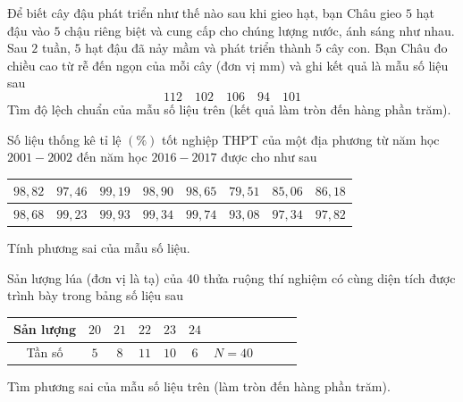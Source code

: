 \begin{bt}%
	Để biết cây đậu phát triển như thế nào sau khi gieo hạt, bạn Châu gieo $5$ hạt đậu vào $5$ chậu riêng biệt và cung cấp cho chúng lượng nước, ánh sáng như nhau. Sau  $2$ tuần, $5$ hạt đậu đã nảy mầm và phát triển thành $5$ cây con. Bạn Châu đo chiều cao từ rễ đến ngọn của mỗi cây (đơn vị mm) và ghi kết quả là mẫu số liệu sau
	 \[112 \quad 102 \quad 106 \quad 94 \quad 101 \]
	 Tìm độ lệch chuẩn của mẫu số liệu trên (kết quả làm tròn đến hàng phần trăm).
\end{bt}

\begin{bt}%
	Số liệu thống kê tỉ lệ $(\%)$ tốt nghiệp THPT của một địa phương từ năm học $2001 - 2002$ đến năm học $2016 - 2017$ được cho như  sau
	\begin{center}
		\begin{tabular}{|c|c|c|c|c|c|c|c|}
			\hline  $98{,}82$ & $97{,}46$ & $99{,}19$ & $98{,}90$ & $98{,}65$ & $79{,}51$ & $85{,}06$ & $86{,}18$ \\
			\hline $98{,}68$ & $99{,}23$  & $99{,}93$ & $99{,}34$ & $99{,}74$ & $93{,}08$ & $97{,}34$ & $97{,}82$ \\
			 \hline
		\end{tabular}
	\end{center}
	Tính phương sai của mẫu số liệu. 
\end{bt}

\begin{bt}%
	Sản lượng lúa (đơn vị là tạ) của $40$ thửa ruộng thí nghiệm có cùng diện tích được trình bày trong bảng số liệu  sau
	\begin{center}
		\begin{tabular}{|c|c|c|c|c|c|c|c|c|c|}
			\hline Sản lượng & $20$ & $21$ & $22$ &  $23$ & $24$ & \\
			\hline Tần số & $5$ & $8$ & $11$ & $10$ & $6$ & $N=40$ \\ 
			\hline 
		\end{tabular}
	\end{center}
	Tìm phương sai của mẫu số liệu trên (làm  tròn đến hàng phần trăm).
\end{bt}


